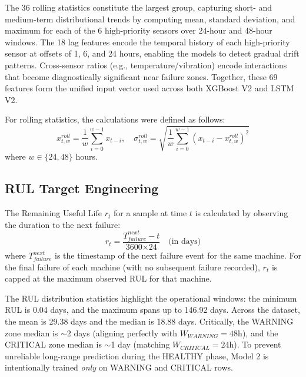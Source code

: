 \documentclass[conference]{IEEEtran}
\begin{document}
The 36 rolling statistics constitute the largest group, capturing short- and medium-term distributional trends by computing mean, standard deviation, and maximum for each of the 6 high-priority sensors over 24-hour and 48-hour windows. The 18 lag features encode the temporal history of each high-priority sensor at offsets of 1, 6, and 24 hours, enabling the models to detect gradual drift patterns. Cross-sensor ratios (e.g., temperature/vibration) encode interactions that become diagnostically significant near failure zones. Together, these 69 features form the unified input vector used across both XGBoost V2 and LSTM V2.

For rolling statistics, the calculations were defined as follows:
\begin{equation}
x^{roll}_{t,w} = \frac{1}{w}\sum_{i=0}^{w-1} x_{t-i}, \quad
\sigma^{roll}_{t,w} = \sqrt{\frac{1}{w}\sum_{i=0}^{w-1}(x_{t-i} - x^{roll}_{t,w})^2}
\label{eq:rolling}
\end{equation}
where $w \in \{24, 48\}$ hours.

\subsection{RUL Target Engineering}
The Remaining Useful Life $r_t$ for a sample at time $t$ is calculated by observing the duration to the next failure:
\begin{equation}
r_t = \frac{T^{next}_{failure} - t}{\text{3600} \times \text{24}} \quad \text{(in days)}
\label{eq:rul}
\end{equation}
where $T^{next}_{failure}$ is the timestamp of the next failure event for the same machine. For the final failure of each machine (with no subsequent failure recorded), $r_t$ is capped at the maximum observed RUL for that machine.

The RUL distribution statistics highlight the operational windows: the minimum RUL is 0.04 days, and the maximum spans up to 146.92 days. Across the dataset, the mean is 29.38 days and the median is 18.88 days. Critically, the WARNING zone median is $\sim$2 days (aligning perfectly with $W_{WARNING}=48$h), and the CRITICAL zone median is $\sim$1 day (matching $W_{CRITICAL}=24$h). To prevent unreliable long-range prediction during the HEALTHY phase, Model 2 is intentionally trained \textit{only} on WARNING and CRITICAL rows.
\end{document}
